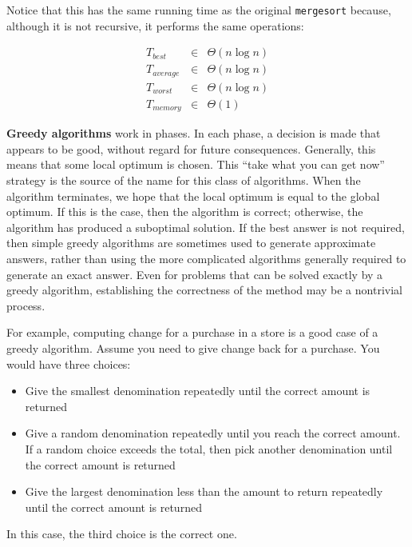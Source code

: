 \documentclass[justified, sixbynine]{tufte-book}
\def\ft{\small\tt}
\theoremstyle{plain}%
\newtheorem * {corollary}{Corollary}
\theoremstyle{definition}
\theoremstyle{remark}
\newtheorem * {remark}{Remark}
\newtheorem * {note}{Note}
\begin{document}
\begin{fullwidth}
Notice that this has the same running time as the original {\ft mergesort} because, although it is not recursive, it performs the same operations:

\begin{eqnarray}
T_{best} &\in &\Theta (n\log n) \\
T_{average} &\in &\Theta (n\log n) \\
T_{worst} &\in &\Theta (n\log n) \\
T_{memory} &\in &\Theta (1)
\end{eqnarray}


{\bf Greedy algorithms}
 work in phases. In each phase, a decision is made
that appears to be good, without regard for future consequences. Generally, 
this means that some local optimum is chosen. This ``take what you can get
now'' strategy is the source of the name for this class of algorithms. When
the algorithm terminates, we hope that the local optimum is equal to the
global optimum. If this is the case, then the algorithm is correct;
otherwise, the algorithm has produced a suboptimal solution. If the best
answer is not required, then simple greedy algorithms are sometimes used to
generate approximate answers, rather than using the more complicated
algorithms generally required to generate an exact answer. Even for problems
that can be solved exactly by a greedy algorithm, establishing the
correctness of the method may be a nontrivial process.

For example, computing change for a purchase in a store is a good case of a greedy algorithm.  Assume you need to give change back for a purchase.  You would have three choices:
\begin{itemize}
\item Give the smallest denomination repeatedly until the correct amount is returned

\item Give a random denomination repeatedly until you reach the correct amount. If a random choice exceeds the total, then pick another denomination until the correct amount is returned

\item Give the largest denomination less than the amount to return repeatedly until the correct amount is returned
\end{itemize}

In this case, the third choice is the correct one.


\end{fullwidth}
\end{document}
